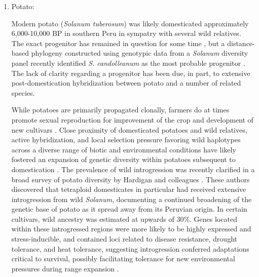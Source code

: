 \documentclass[11pt]{article}
\begin{document}
{\begin{enumerate}
The findings of \citet{choi2018multiple} bear similarities to a hypothesis posited by Vaughan and colleagues \citeyearpar{vaughan2008evolving} that stresses the potential adaptive significance of crop-wild gene flow in rice.
According to this hypothesis, domestication alleles arose in a single cultivated rice population and subsequently introgressed into diverse cultivated populations (some \emph{japonica}-like, some \emph{indica}-like).
As these domesticated populations spread further into new environments, they potentially received introgression from locally adapted wild relatives, retaining alleles that improved fitness.
While the precise history of domesticated rice remains in question, multiple lines of evidence indicate diverse wild populations have contributed to domesticated germplasm and suggest adaptive introgression may have played a role during the expansion of this important crop.

\item{Potato:}

Modern potato (\emph{Solanum tuberosum}) was likely domesticated approximately 6,000-10,000 BP in southern Peru in sympatry with several wild relatives.
The exact progenitor has remained in question for some time \citep{spooner2005single, pickersgill1977origins, hawkes1988evolution}, but a distance-based phylogeny constructed using genotypic data from a \emph{Solanum} diversity panel recently identified \emph{S. candolleanum} as the most probable progenitor \citep{hardigan2015taxonomy}.
The lack of clarity regarding a progenitor has been due, in part, to extensive post-domestication hybridization between potato and a number of related species.

While potatoes are primarily propagated clonally, farmers do at times promote sexual reproduction for improvement of the crop and development of new cultivars \citep{quiros1992increase}.
Close proximity of domesticated potatoes and wild relatives, active hybridization, and local selection pressure favoring wild haplotypes across a diverse range of biotic and environmental conditions have likely fostered an expansion of genetic diversity within potatoes subsequent to domestication \citep{brush1995potato}.
The prevalence of wild introgression was recently clarified in a broad survey of potato diversity by Hardigan and colleagues \citeyearpar{hardigan2017genome}.
These authors discovered that tetraploid domesticates in particular had received extensive introgression from wild \emph{Solanum}, documenting a continued broadening of the genetic base of potato as it spread away from its Peruvian origin.
In certain cultivars, wild ancestry was estimated at upwards of 30\%.
Genes located within these introgressed regions were more likely to be highly expressed and stress-inducible, and contained loci related to disease resistance, drought tolerance, and heat tolerance, suggesting introgression conferred adaptations critical to survival, possibly facilitating tolerance for new environmental pressures during range expansion \citep{hardigan2017genome}.
\end{enumerate}

}
\end{document}
